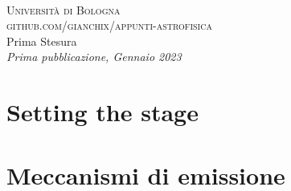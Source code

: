 \documentclass[11pt]{book} %
\begin{document}
\newpage
~\vfill
\thispagestyle{empty}


\noindent \textsc{Università di Bologna}\\

\noindent \textsc{github.com/gianchix/appunti-astrofisica}\\ %

\noindent Prima Stesura\\ %

\noindent \textit{Prima pubblicazione, Gennaio 2023} %



\pagestyle{empty} %

\hypersetup{linkcolor = black}
\tableofcontents %


\pagestyle{fancy} %
\hypersetup{linkcolor = ocre}


%
{} %
\chapter{Setting the stage}




\chapter{Meccanismi di emissione}






\end{document}

